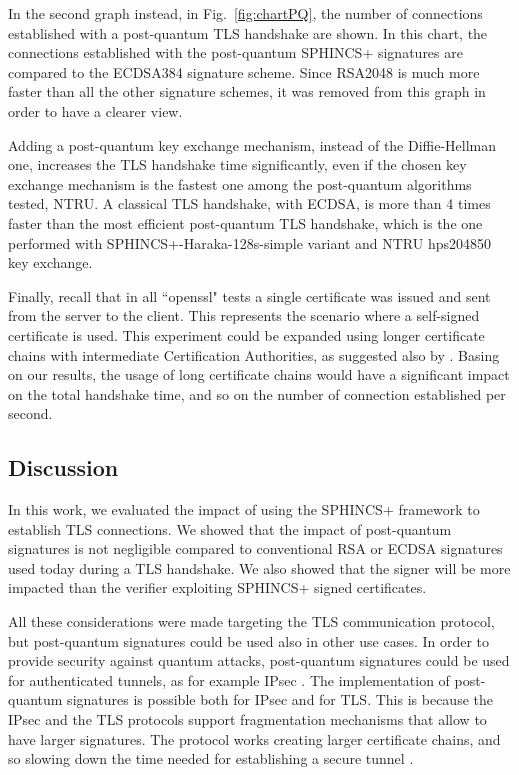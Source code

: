 \documentclass[a4paper,12pt]{article}
\def\myfig#1{Fig.~#1\xspace}
\begin{document}
In the second graph instead, in \myfig{\ref{fig:chartPQ}}, the number of connections established with a post-quantum TLS handshake are shown. In this chart, the connections established with the post-quantum SPHINCS+ signatures are compared to the ECDSA384 signature scheme. Since RSA2048 is much more faster than all the other signature schemes, it was removed from this graph in order to have a clearer view.

Adding a post-quantum key exchange mechanism, instead of the Diffie-Hellman one, increases the TLS handshake time significantly, even if the chosen key exchange mechanism is the fastest one among the post-quantum algorithms tested, NTRU. A classical TLS handshake, with ECDSA, is more than 4 times faster than the most efficient post-quantum TLS handshake, which is the one performed with SPHINCS+-Haraka-128s-simple variant and NTRU hps204850 key exchange. 

Finally, recall that in all ``openssl" tests a single certificate was issued and sent from the server to the client. This represents the scenario where a self-signed certificate is used.
This experiment could be expanded using longer certificate chains with intermediate Certification Authorities, as suggested also by \cite{6_NISTPQC_TLS_SSH}. Basing on our results, the usage of long certificate chains would have a significant impact on the total handshake time, and so on the number of connection established per second.

\subsection{Discussion}
\label{sub:discussion}

In this work, we evaluated the impact of using the SPHINCS+ framework to establish TLS connections. We showed that the impact of post-quantum signatures is not negligible compared to conventional RSA or ECDSA signatures used today during a TLS handshake. We also showed that the signer will be more impacted than the verifier exploiting SPHINCS+ signed certificates.

All these considerations were made targeting the TLS communication protocol, but post-quantum signatures could be used also in other use cases. In order to provide security against quantum attacks, post-quantum signatures could be used for authenticated tunnels, as for example IPsec \cite{5_postquantum_signature_usecase}.
The implementation of post-quantum signatures is possible both for IPsec and for TLS. This is because the IPsec and the TLS protocols support fragmentation mechanisms that allow to have larger signatures. The protocol works creating larger certificate chains, and so slowing down the time needed for establishing a secure tunnel \cite{53_AuthTests}.
\end{document}
